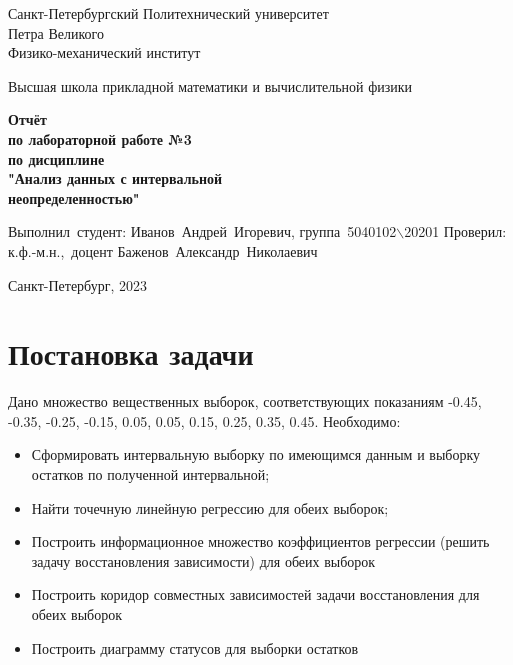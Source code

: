 \documentclass[12pt,a4paper]{article}
\begin{document}
	
	\begin{titlepage}
		
		\begin{center}
			\begin{large}
				Санкт-Петербургский Политехнический университет\\ Петра Великого\\
				Физико-механический институт\\
			\end{large}
			\vspace{0.2cm}
			Высшая школа прикладной математики и вычислительной физики\\
			
		\end{center}
		
		\vspace{3cm}
		\begin{center}
			\textbf{Отчёт\\ по лабораторной работе №3\\ по дисциплине\\ "Анализ данных с интервальной \\неопределенностью"}
		\end{center}
		
		\vspace{3cm}
		
		\vbox{%
			\hfill%
			\vbox{%
				\hbox{Выполнил студент:}%
				\hbox{\break}
				\hbox{Иванов Андрей Игоревич,}%
				\hbox{группа 5040102$\backslash$20201}%
				\hbox{\break}
				\hbox{\break}
				\hbox{Проверил:}
				\hbox{\break}
				\hbox{к.ф.-м.н., доцент}
				\hbox{Баженов Александр Николаевич}
			}%
		} 
		\vfill
		
		\begin{center}
			Санкт-Петербург, 2023
		\end{center}
	
	\end{titlepage}
	\tableofcontents
	\newpage
	
	\listoffigures
	\newpage
	
	\section{Постановка задачи}
            Дано множество вещественных выборок, соответствующих показаниям -0.45, -0.35, -0.25, -0.15, 0.05, 0.05, 0.15, 0.25, 0.35, 0.45. Необходимо:
            \begin{itemize}
                \item Сформировать интервальную выборку по имеющимся данным и выборку остатков по полученной интервальной;
                \item Найти точечную линейную регрессию для обеих выборок;
                \item Построить информационное множество коэффициентов регрессии (решить задачу восстановления зависимости) для обеих выборок
                \item Построить коридор совместных зависимостей задачи восстановления для обеих выборок
                \item Построить диаграмму статусов для выборки остатков
            \end{itemize}
	\newpage
	
\end{document}
